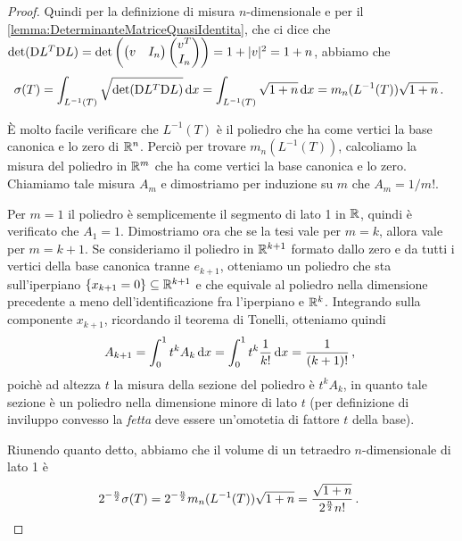 \begin{proof}
	Quindi per la definizione di misura $n$-dimensionale e per il \cref{lemma:DeterminanteMatriceQuasiIdentita}, che ci dice che $\det(\mathrm D L^T\mathrm D L)=\det\left(\begin{pmatrix}v& I_n\end{pmatrix}\begin{pmatrix}v^T\\I_n\end{pmatrix}\right)=1+\lvert v\rvert^2=1+n$, abbiamo che
	\begin{equation*}
		\sigma(T)=\int_{L^{-1}(T)}\sqrt{\det(\mathrm D L^T\mathrm D L)}\,\mathrm d x= \int_{L^{-1}(T)}\sqrt{1+n}\,\mathrm d x=m_n(L^{-1}(T))\sqrt{1+n}\, \text{. }
	\end{equation*}

	È molto facile verificare che $L^{-1}(T)$ è il poliedro che ha come vertici la base canonica e lo zero di $\mathbb R^n$. Perciò per trovare $m_n(L^{-1}(T))$, calcoliamo la misura del poliedro in $\mathbb R^m$ che ha come vertici la base canonica e lo zero. Chiamiamo tale misura $A_m$ e dimostriamo per induzione su $m$ che $A_m=1/m!$.
	
	Per $m=1$ il poliedro è semplicemente il segmento di lato 1 in $\mathbb R$, quindi è verificato che $A_1=1$. Dimostriamo ora che se la tesi vale per $m=k$, allora vale per $m=k+1$. Se consideriamo il poliedro in $\mathbb R^{k+1}$ formato dallo zero e da tutti i vertici della base canonica tranne $e_{k+1}$, otteniamo un poliedro che sta sull'iperpiano $\{x_{k+1}=0\}\subseteq\mathbb R^{k+1}$ e che equivale al poliedro nella dimensione precedente a meno dell'identificazione fra l'iperpiano e $\mathbb R^k$. 
	Integrando sulla componente $x_{k+1}$, ricordando il teorema di Tonelli, otteniamo quindi
	\begin{equation*}
		A_{k+1}=\int_0^1t^kA_k\,\mathrm d x=\int_0^1t^k\frac 1{k!}\,\mathrm d x=\frac 1{(k+1)!}\, \text{, }
	\end{equation*}
	poichè ad altezza $t$ la misura della sezione del poliedro è $t^kA_k$, in quanto tale sezione è un poliedro nella dimensione minore di lato $t$ (per definizione di inviluppo convesso la \emph{fetta} deve essere un'omotetia di fattore $t$ della base).
	
	Riunendo quanto detto, abbiamo che il volume di un tetraedro $n$-dimensionale di lato 1 è
	\begin{equation*}
		2^{-\frac n2}\sigma(T)=2^{-\frac n2}m_n(L^{-1}(T))\sqrt{1+n}=\frac{\sqrt{1+n}}{2^{\frac n2}n!}\, \text{. }		
	\end{equation*}
		
\end{proof}


